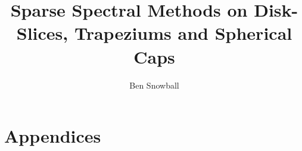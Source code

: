 \documentclass[a4paper,12pt,twoside]{report}
\begin{document}
\title{\LARGE {\bf Sparse Spectral Methods on Disk-Slices, Trapeziums and Spherical Caps}\\
 \vspace*{6mm}
}
\author{Ben Snowball}

\maketitle


\preface











\body







\appendix
\chapter*{Appendices}
\renewcommand{\thesection}{A}



%

\end{document}
